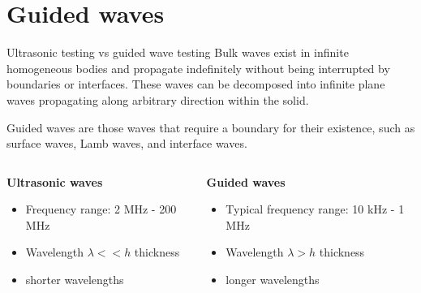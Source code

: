 \documentclass[10pt,aspectratio=169,dvipsnames]{beamer} %
\begin{document}
	\section{Guided waves}
	\begin{frame}{Ultrasonic testing vs guided wave testing}
		\alert{Bulk waves} exist in infinite homogeneous bodies and propagate indefinitely without being interrupted by boundaries or interfaces. 
		These waves can be decomposed into infinite plane waves propagating along arbitrary direction within the solid.
		
		\alert{Guided waves} are those waves that require a boundary for their existence, such as surface waves, Lamb waves, and interface waves.
		\vspace{5mm}
		\begin{columns}[T]
			\begin{column}{0.5\textwidth}
				\textbf{Ultrasonic waves}	
				\begin{itemize}
					\item Frequency range: 2 MHz - 200 MHz
					\item Wavelength \(\lambda << h\) thickness 
					\item shorter wavelengths
				\end{itemize}
			\end{column}
			\begin{column}{0.5\textwidth}
				\textbf{Guided waves}	
				\begin{itemize}
					\item Typical frequency range: 10 kHz - 1 MHz
					\item Wavelength \(\lambda > h\) thickness 
					\item longer wavelengths
				\end{itemize}
			\end{column}
		\end{columns}			
	\end{frame}
\end{document}
